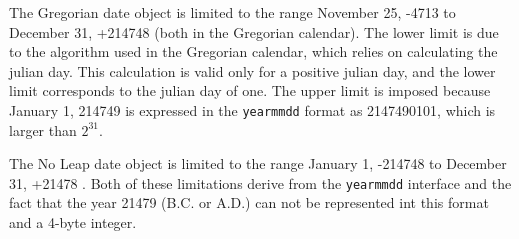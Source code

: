 
The Gregorian date object is limited to the range
November 25, -4713 to December 31, +214748 (both in the Gregorian calendar).  The lower limit
is due to the algorithm used in the Gregorian calendar, which relies on
calculating the julian day.  This calculation is valid only for a positive
julian day, and the lower limit corresponds to the julian day of one.  The
upper limit is imposed because January 1, 214749 is expressed in the {\tt yearmmdd}
format as 2147490101, which is larger than \( 2^{31} \).

The No Leap date object is limited to the range January 1, -214748 to
December 31, +21478 .  Both of these limitations derive from the {\tt yearmmdd}
interface and the fact that the year 21479 (B.C. or A.D.) can not be represented
int this format and a 4-byte integer.



